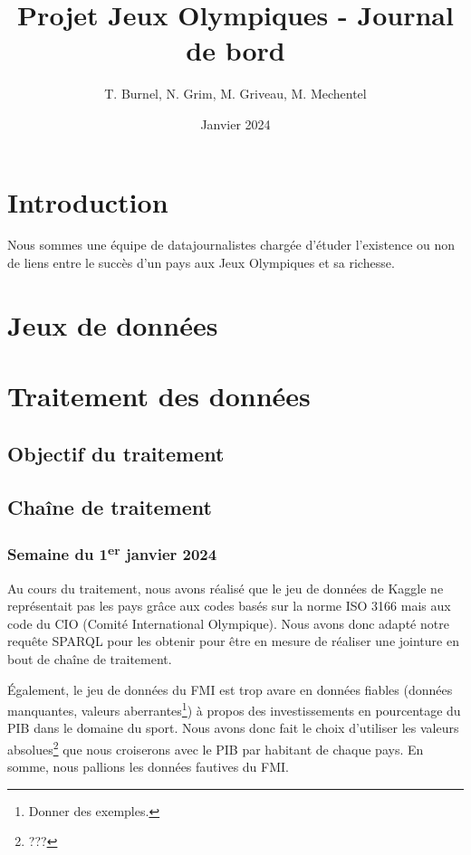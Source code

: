 \documentclass[hidelinks, 12pt]{article}
\title{Projet Jeux Olympiques - Journal de bord}
\date{Janvier 2024}
\author{T. Burnel, N. Grim, M. Griveau, M. Mechentel}
\begin{document}
	\maketitle
	
	\section{Introduction}
	
	
	Nous sommes une équipe de datajournalistes chargée d'étuder l'existence ou non de liens entre le succès d'un pays aux Jeux Olympiques et sa richesse.
	
	\section{Jeux de données}	
	
	\section{Traitement des données}
	
		\subsection{Objectif du traitement}
		
		\subsection{Chaîne de traitement}
		
			\subsubsection{Semaine du 1\textsuperscript{er} janvier 2024}
		
			Au cours du traitement, nous avons réalisé que le jeu de données de Kaggle ne représentait pas les pays grâce aux codes basés sur la norme ISO 3166 mais aux code du CIO (Comité International Olympique). Nous avons donc adapté notre requête SPARQL pour les obtenir pour être en mesure de réaliser une jointure en bout de chaîne de traitement.
		
			Également, le jeu de données du FMI est trop avare en données fiables (données manquantes, valeurs aberrantes\footnote{Donner des exemples.}) à propos des investissements en pourcentage du PIB dans le domaine du sport. Nous avons donc fait le choix d'utiliser les valeurs absolues\footnote{???} que nous croiserons avec le PIB par habitant de chaque pays. En somme, nous pallions les données fautives du FMI.
		
\end{document}
